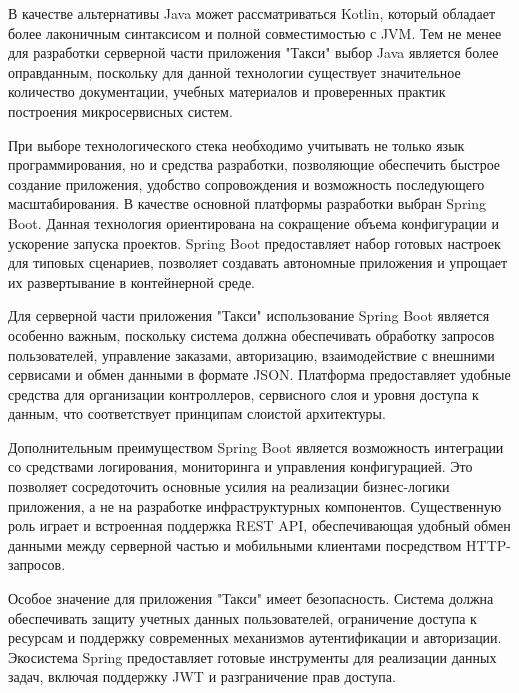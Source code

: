 {	\par \redline В качестве альтернативы Java может рассматриваться Kotlin, который обладает более лаконичным синтаксисом и полной совместимостью с JVM. Тем не менее для разработки серверной части приложения "Такси"{} выбор Java является более оправданным, поскольку для данной технологии существует значительное количество документации, учебных материалов и проверенных практик построения микросервисных систем.
	
	\par \redline При выборе технологического стека необходимо учитывать не только язык программирования, но и средства разработки, позволяющие обеспечить быстрое создание приложения, удобство сопровождения и возможность последующего масштабирования. В качестве основной платформы разработки выбран Spring Boot. Данная технология ориентирована на сокращение объема конфигурации и ускорение запуска проектов. Spring Boot предоставляет набор готовых настроек для типовых сценариев, позволяет создавать автономные приложения и упрощает их развертывание в контейнерной среде.
	
	\par \redline Для серверной части приложения "Такси"{} использование Spring Boot является особенно важным, поскольку система должна обеспечивать обработку запросов пользователей, управление заказами, авторизацию, взаимодействие с внешними сервисами и обмен данными в формате JSON. Платформа предоставляет удобные средства для организации контроллеров, сервисного слоя и уровня доступа к данным, что соответствует принципам слоистой архитектуры.
	
	\par \redline Дополнительным преимуществом Spring Boot является возможность интеграции со средствами логирования, мониторинга и управления конфигурацией. Это позволяет сосредоточить основные усилия на реализации бизнес-логики приложения, а не на разработке инфраструктурных компонентов. Существенную роль играет и встроенная поддержка REST API, обеспечивающая удобный обмен данными между серверной частью и мобильными клиентами посредством HTTP-запросов.
	
	\par \redline Особое значение для приложения "Такси"{} имеет безопасность. Система должна обеспечивать защиту учетных данных пользователей, ограничение доступа к ресурсам и поддержку современных механизмов аутентификации и авторизации. Экосистема Spring предоставляет готовые инструменты для реализации данных задач, включая поддержку JWT и разграничение прав доступа.
	
}
